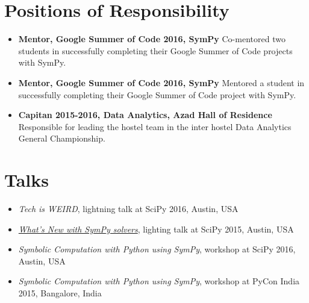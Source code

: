 \documentclass[a4paper,10pt]{article}
\begin{document}
\section{Positions of Responsibility}
\begin{itemize}

    \item \textbf{Mentor, Google Summer of Code 2016, SymPy}
    Co-mentored two students in successfully completing their Google Summer of
    Code projects with SymPy.

    \item \textbf{Mentor, Google Summer of Code 2016, SymPy}
    Mentored a student in successfully completing their Google Summer of
    Code project with SymPy.

    \item \textbf{Capitan 2015-2016, Data Analytics, Azad Hall of Residence}
    Responsible for leading the hostel team in the inter hostel
    Data Analytics General Championship.

\end{itemize}

\section{Talks}
\begin{itemize}
    \item \emph{Tech is WEIRD}, lightning talk at SciPy 2016, Austin, USA
    \item \emph{\href{https://www.youtube.com/watch?v=YCxQI4C34j8}{What's New with
        SymPy solvers}}, lighting talk at SciPy 2015, Austin, USA
    \item \emph{Symbolic Computation with Python using SymPy}, workshop at
        SciPy 2016, Austin, USA
    \item \emph{Symbolic Computation with Python using SymPy}, workshop at PyCon India
        2015, Bangalore, India
\end{itemize}

\end{document}
